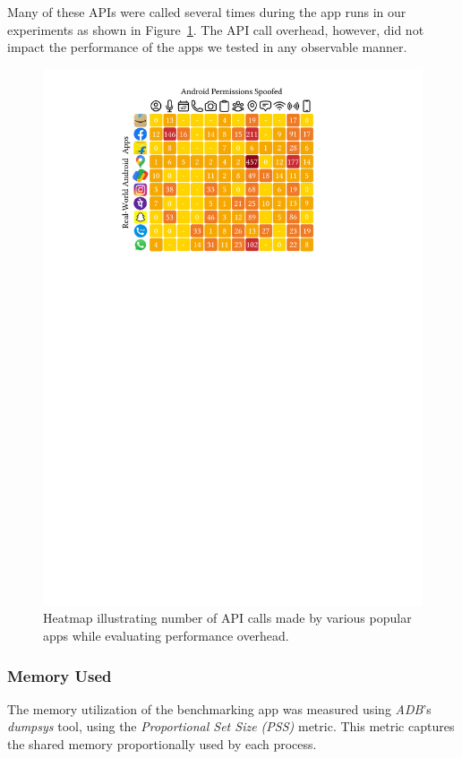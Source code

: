 Many of these APIs were called several times during the app runs in our
experiments as shown in Figure~\ref{fig:reslts_noAPICalls}. The API call
overhead, however, did not impact the performance of the apps we tested in any
observable manner.

\begin{figure}[t]
    \includegraphics[width=0.8\linewidth]{Figures/Performance Evaluation/evaluation_api_calls_heatmap.pdf}
    \caption{Heatmap illustrating number of API calls made by various popular apps while evaluating performance overhead.}
    \label{fig:reslts_noAPICalls}
\end{figure}

\subsubsection*{\textbf{Memory Used}} 
The memory utilization of the benchmarking app was measured using \textit{ADB}'s
\textit{dumpsys} tool, using the \textit{Proportional Set Size (PSS)} metric.
This metric captures the shared memory proportionally used by each
process.

